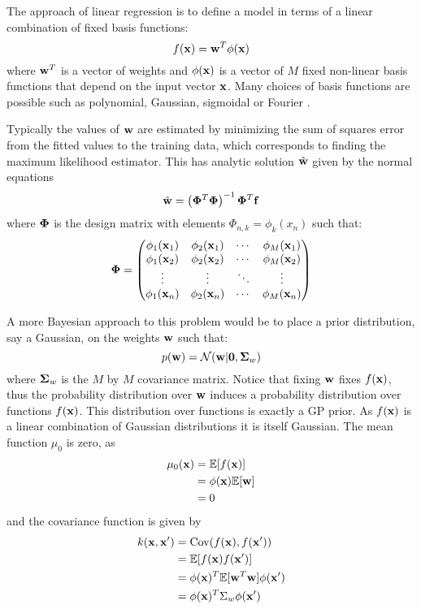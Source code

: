 The approach of linear regression is to define a model in terms of a linear combination of fixed basis functions:
%
\begin{equation}
f(\mathbf{x}) = \mathbf{w}^T\phi(\mathbf{x})
\end{equation}
%
where $\mathbf{w}^T$ is a vector of weights and $\phi(\mathbf{x})$ is a vector of $M$ fixed non-linear basis functions that depend on the input vector $\mathbf{x}$. Many choices of basis functions are possible such as polynomial, Gaussian, sigmoidal or Fourier \cite{christopher2006pattern}. 

Typically the values of $\mathbf{w}$ are estimated by minimizing the sum of squares error from the fitted values to the training data, which corresponds to finding the maximum likelihood estimator. This has analytic solution $\hat{\mathbf{w}}$ given by the normal equations \cite{christopher2006pattern}
%
\begin{equation}
\hat{\mathbf{w}} = \left(\mathbf{\Phi}^T\mathbf{\Phi}\right)^{-1}\mathbf{\Phi}^T\mathbf{f}
\end{equation}
% 
where $\mathbf{\Phi}$ is the design matrix with elements $\Phi_{n, k} = \phi_k(x_n)$ such that:
%
\begin{equation}
\mathbf{\Phi} = 
\begin{pmatrix}
 \phi_1(\mathbf{x}_1) & \phi_2(\mathbf{x}_1) & \cdots & \phi_M(\mathbf{x}_1) \\
 \phi_1(\mathbf{x}_2) & \phi_2(\mathbf{x}_2) & \cdots & \phi_M(\mathbf{x}_2) \\
 \vdots  & \vdots  & \ddots & \vdots  \\
 \phi_1(\mathbf{x}_n) & \phi_2(\mathbf{x}_n) & \cdots & \phi_M(\mathbf{x}_n) 
\end{pmatrix}
\end{equation}
%

A more Bayesian approach to this problem would be to place a prior distribution, say a Gaussian, on the weights $\mathbf{w}$ such that:
%
\begin{equation}
p(\mathbf{w}) = \mathcal{N}(\mathbf{w} | \mathbf{0}, \mathbf{\Sigma}_w)
\end{equation}
%
where $\mathbf{\Sigma}_w$ is the $M$ by $M$ covariance matrix. Notice that fixing $\mathbf{w}$ fixes $f(\mathbf{x})$, thus the probability distribution over $\mathbf{w}$ induces a probability distribution over functions $f(\mathbf{x})$. This distribution over functions is exactly a GP prior. As $f(\mathbf{x})$ is a linear combination of Gaussian distributions it is itself Gaussian. The mean function $\mu_0$ is zero, as
%
\begin{align}
\nonumber \mu_0(\mathbf{x}) &= \mathbb{E}[f(\mathbf{x})]  \\
\nonumber           &= \phi(\mathbf{x}) \mathbb{E}[\mathbf{w}] \\
                    &= 0
\end{align}
%
and the covariance function is given by
%
\begin{align}
\nonumber k(\mathbf{x}, \mathbf{x}') &= \mathrm{Cov}(f(\mathbf{x}), f(\mathbf{x}')) \\
\nonumber            &= \mathbb{E}[f(\mathbf{x})f(\mathbf{x}')] \\
\nonumber		     &= \phi(\mathbf{x})^T \mathbb{E}[\mathbf{w}^T\mathbf{w}] \phi(\mathbf{x}') \\
		             &= \phi(\mathbf{x})^T \Sigma_w \phi(\mathbf{x}')
\end{align}

